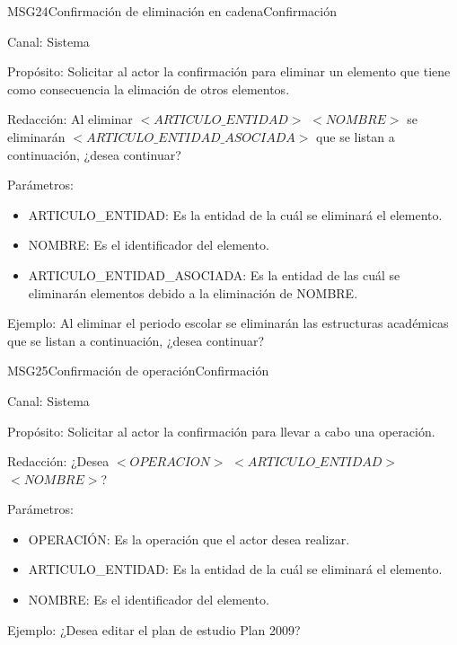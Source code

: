 \begin{mensaje}{MSG24}{Confirmación de eliminación en cadena}{Confirmación}
	\item[Canal:] Sistema
	\item[Propósito:] Solicitar al actor la confirmación para eliminar un elemento que tiene como consecuencia la elimación de otros elementos.
	\item[Redacción:] Al eliminar $<ARTICULO\_ENTIDAD>$ $<NOMBRE>$ se eliminarán $<ARTICULO\_ENTIDAD\_ASOCIADA>$ que se listan a continuación, ¿desea continuar?
	\item[Parámetros:] 
	\begin{itemize}
		\item ARTICULO\_ENTIDAD: Es la entidad de la cuál se eliminará el elemento.
		\item NOMBRE: Es el identificador del elemento.
		\item ARTICULO\_ENTIDAD\_ASOCIADA: Es la entidad de las cuál se eliminarán elementos debido a la eliminación de NOMBRE.
	\end{itemize}
	\item[Ejemplo:]  Al eliminar el periodo escolar se eliminarán las estructuras académicas que se listan a continuación, ¿desea continuar?
	
\end{mensaje}

\begin{mensaje}{MSG25}{Confirmación de operación}{Confirmación}
	\item[Canal:] Sistema
	\item[Propósito:] Solicitar al actor la confirmación para llevar a cabo una operación.
	\item[Redacción:] ¿Desea $<OPERACION>$ $<ARTICULO\_ENTIDAD>$ $<NOMBRE>$?
	\item[Parámetros:] 
	\begin{itemize}
		\item OPERACIÓN: Es la operación que el actor desea realizar.
		\item ARTICULO\_ENTIDAD: Es la entidad de la cuál se eliminará el elemento.
		\item NOMBRE: Es el identificador del elemento.
	\end{itemize}
	\item[Ejemplo:] ¿Desea editar el plan de estudio Plan 2009?
\end{mensaje}

